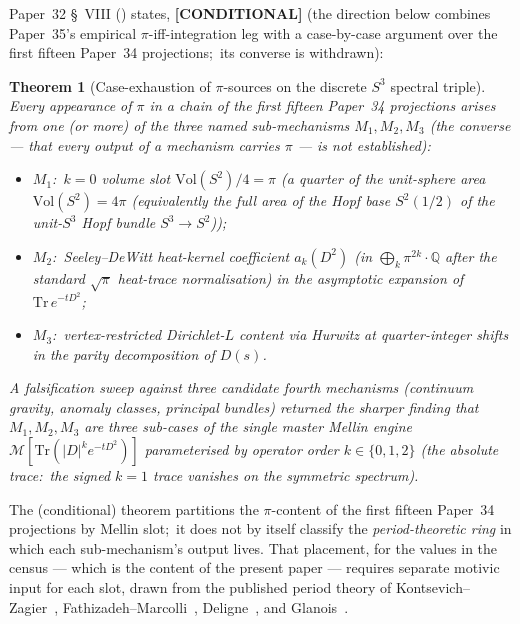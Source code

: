 \documentclass[11pt,a4paper]{article}
\theoremstyle{plain}
\newtheorem{theorem}{Theorem}[section]
\theoremstyle{definition}
\newcommand{\sthree}{S^{3}}
\newcommand{\Q}{\mathbb{Q}}
\newcommand{\Vol}{\mathrm{Vol}}
\newcommand{\Tr}{\mathrm{Tr}}
\newcommand{\Mcal}{\mathcal{M}}
\begin{document}
Paper~32 \S~VIII (\cite{loutey_paper32}) states, \textbf{[CONDITIONAL]}
(the direction below combines Paper~35's empirical $\pi$-iff-integration
leg with a case-by-case argument over the first fifteen Paper~34
projections;\ its converse is withdrawn):
\begin{theorem}[Case-exhaustion of $\pi$-sources on the discrete
$\sthree$ spectral triple]
\label{thm:case_exhaustion}
Every appearance of $\pi$ in a chain of the first fifteen Paper~34
projections arises from one (or more) of the three named
sub-mechanisms $M_1, M_2, M_3$ (the converse --- that every output of
a mechanism carries $\pi$ --- is not established):
\begin{itemize}
  \item $M_1$:\ $k = 0$ volume slot $\Vol(S^2)/4 = \pi$ (a quarter of the unit-sphere area $\Vol(S^2) = 4\pi$ (equivalently the full area of the Hopf base $S^2(1/2)$ of the unit-$S^3$ Hopf bundle $\sthree \to S^2$));
  \item $M_2$:\ Seeley--DeWitt heat-kernel coefficient
    $a_k(D^2)$ (in $\bigoplus_k \pi^{2k}\cdot\Q$ after the standard $\sqrt{\pi}$
    heat-trace normalisation) in the asymptotic expansion of
    $\Tr\,e^{-tD^2}$;
  \item $M_3$:\ vertex-restricted Dirichlet-$L$ content via Hurwitz at
    quarter-integer shifts in the parity decomposition of $D(s)$.
\end{itemize}
A falsification sweep against three candidate fourth mechanisms
(continuum gravity, anomaly classes, principal bundles) returned the
sharper finding that $M_1, M_2, M_3$ are three sub-cases of the single
master Mellin engine $\Mcal[\Tr(|D|^k e^{-tD^2})]$ parameterised by
operator order $k \in \{0, 1, 2\}$ (the absolute trace:\ the signed $k = 1$
trace vanishes on the symmetric spectrum).
\end{theorem}

The (conditional) theorem partitions the $\pi$-content of the first fifteen Paper~34 projections by Mellin slot;\ it does
not by itself classify the \emph{period-theoretic ring} in which each
sub-mechanism's output lives.  That placement, for the values in the
census --- which is the content of the present paper --- requires separate motivic input for
each slot, drawn from the published period theory of
Kontsevich--Zagier~\cite{kontsevich_zagier2001},
Fathizadeh--Marcolli~\cite{fathizadeh_marcolli2016},
Deligne~\cite{deligne2010}, and Glanois~\cite{glanois2015}.

\end{document}
